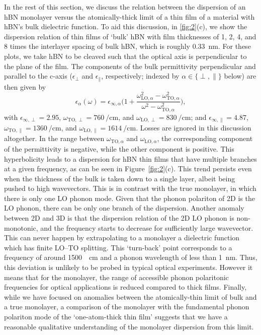 \documentclass[aps,prb,twocolumn,
	           groupedaddress,superscriptaddress,
               amsfonts,amssymb,amsmath,floatfix,
	           citeautoscript]{revtex4-1}
\begin{document}
In the rest of this section, we discuss the relation between the dispersion of an hBN monolayer versus the atomically-thick limit of a thin film of a material with hBN's bulk dielectric function. To aid this discussion, in \ref{fig:2}(c), we show the dispersion relation of thin films of `bulk' hBN with film thicknesses of 1, 2, 4, and 8 times the interlayer spacing of bulk hBN, which is roughly \SI{0.33}{\nm}. For these plots, we take hBN to be cleaved such that the optical axis is perpendicular to the plane of the film. The components of the bulk permittivity perpendicular and parallel to the c-axis ($\epsilon_{\perp}$ and $\epsilon_{\parallel}$, respectively; indexed by $\alpha\in\{\perp,\parallel\}$ below) are then given by
\begin{equation}
\epsilon_{\alpha}(\omega) = \epsilon_{\infty,\alpha}\Bigg(1 + \frac{\omega^2_{\mathrm{LO},\alpha}-\omega^2_{\mathrm{TO},\alpha}}{\omega^2-\omega^2_{\mathrm{TO},\alpha}} \Bigg),
\end{equation}
with $\epsilon_{\infty,\perp} = \num{2.95}$, $\omega_{\mathrm{TO},\perp} = \SI{760}{\per\cm}$, and $\omega_{\mathrm{LO},\perp} = \SI{830}{\per\cm}$; and $\epsilon_{\infty,\parallel} = \num{4.87}$, $\omega_{\mathrm{TO},\parallel} = \SI{1360}{\per\cm}$, and $\omega_{\mathrm{LO},\parallel} = \SI{1614}{\per\cm}$\cite{caldwell2014sub,dai2014tunable}.
Losses are ignored in this discussion altogether. 
In the range between $\omega_{\mathrm{TO}, \alpha}$ and $\omega_{\mathrm{LO}, \alpha}$, the corresponding component of the permittivity is negative, while the other component is positive. This hyperbolicity leads to a dispersion for hBN thin films that have multiple branches at a given frequency, as can be seen in Figure~\ref{fig:2}(c).  This trend persists even when the thickness of the bulk is taken down to a single layer, albeit being pushed to high wavevectors. This is in contrast with the true monolayer, in which there is only one LO phonon mode. Given that the phonon polariton of 2D is the LO phonon, there can be only one branch of the dispersion. Another anomaly between 2D and 3D is that the dispersion relation of the 2D LO phonon is non-monotonic, and the frequency starts to decrease for sufficiently large wavevector. This can never happen by extrapolating to a monolayer a dielectric function which has finite LO--TO splitting. This `turn-back' point corresponds to a frequency of around \SI{1500}{\per\cm} and a phonon wavelength of less than \SI{1}{\nm}. Thus, this deviation is unlikely to be probed in typical optical experiments. However it means that for the monolayer, the range of accessible phonon polaritonic frequencies for optical applications is reduced compared to thick films. Finally, while we have focused on anomalies between the atomically-thin limit of bulk and a true monolayer, a comparison of the monolayer with the fundamental phonon polariton mode of the `one-atom-thick thin film' suggests that we have a reasonable qualitative understanding of the monolayer dispersion from this limit.
\end{document}
